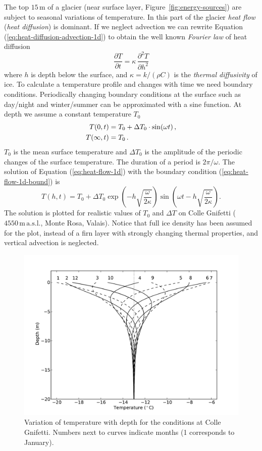 \documentclass[parskip=half]{scrartcl}
\newcommand{\unit}[1]{\ensuremath{\,\mathrm{#1}}}
\newcommand{\s}[1]{\ensuremath{\,\mathrm{#1}}}
\newcommand{\ddt}[1]{\ensuremath{\frac{\partial #1}{\partial t}}}
\begin{document}
The top $15\s{m}$ of a glacier (near surface layer,
Figure~\ref{fig:energy-sources}) are subject to seasonal variations of
temperature. In this part of the glacier \emph{heat flow} (\emph{heat
diffusion}) is dominant.  If we neglect advection we can rewrite
Equation (\ref{eq:heat-diffusion-advection-1d}) to obtain the well
known \emph{Fourier law} of heat diffusion
%
\begin{equation}
 \label{eq:heat-flow-1d} \ddt{T} = \kappa \,
\frac{\partial^2T}{\partial h^2}
\end{equation}
%
where $h$ is depth below the surface, and $\kappa=k/(\rho C)$ is the
\emph{thermal diffusivity} of ice.  To calculate a temperature profile
and changes with time we need boundary conditions.  Periodically
changing boundary conditions at the surface such as day/night and
winter/summer can be approximated with a sine function.  At depth we
assume a constant temperature $T_0$
%
\begin{align}
 \label{eq:heat-flow-1d-bound} T(0,t) &= T_0 + \Delta T_0 \cdot
\sin(\omega t)\,, \notag\\ T(\infty,t) &= T_0\,.
\end{align}
%
$T_0$ is the mean surface temperature and $\Delta T_0$ is the
amplitude of the periodic changes of the surface temperature.  The
duration of a period is $2\pi/\omega$.  The solution of Equation
(\ref{eq:heat-flow-1d}) with the boundary condition
(\ref{eq:heat-flow-1d-bound}) is
%
\begin{equation}
 \label{eq:heat-flow-1d-solution} T(h,t) = T_0 + \Delta T_0
\exp\left(-h \sqrt{\frac{\omega}{2\kappa}}\right) \sin\left(\omega t -
h \sqrt{\frac{\omega}{2\kappa}}\right).
\end{equation}
%
The solution is plotted for realistic values of $T_0$ and $\Delta T$
on Colle Gnifetti ($4550\unit{m} \unit{a.s.l.}$, Monte Rosa, Valais).
Notice that full ice density has been assumed for the plot, instead of
a firn layer with strongly changing thermal properties, and vertical
advection is neglected.
%
\begin{figure}[htbp] \centering
 \includegraphics[height=10.cm]{figures/temp-variation}
 \caption{Variation of temperature with depth for the conditions at
Colle Gnifetti.  Numbers next to curves indicate months (1 corresponds
to January). }
 \label{fig:water}
\end{figure}
\end{document}
